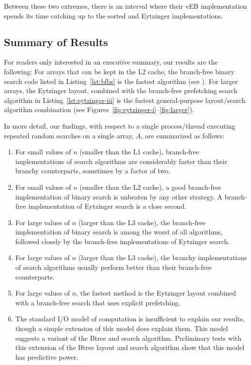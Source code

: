 \documentclass{patmorin}
\newcommand{\lstref}[1]{Listing~\ref{lst:#1}}
\begin{document}
Between these two extremes, there is an interval where their vEB
implementation spends its time catching up to the sorted and Eytzinger
implementations.


\subsection{Summary of Results}

For readers only interested in an executive summary, our results are the
following: For arrays that can be kept in the L2 cache, the branch-free
binary search code listed in \lstref{bfbs} is the fastest algorithm (see
).  For larger arrays, the Eytzinger layout, combined
with the branch-free prefetching search algorithm in \lstref{eytzinger-iii}
is the fastest general-purpose layout/search algorithm combination
(see Figures~\ref{fig:eytzinger-i}--\ref{fig:larger}).

In more detail, our findings, with respect to a single process/thread
executing repeated random searches on a single array, $A$, are summarized
as follows:

\begin{enumerate}
  \item For small values of $n$ (smaller than the L1 cache), branch-free
    implementations of search algorithms are considerably faster than their
    branchy counterparts, sometimes by a factor of two.
  
  \item For small values of $n$ (smaller than the L2 cache), a good
    branch-free implementation of binary search is unbeaten by any other
    strategy.  A branch-free implementation of Eytzinger search is a
    close second.
  
  \item For large values of $n$ (larger than the L3 cache), the branch-free
    implementation of binary search is among the worst of all algorithms,
    followed closely by the branch-free implementations of Eytzinger
    search.
  
  \item For large values of $n$ (larger than the L3 cache), the branchy
    implementations of search algorithms usually perform better than their
    branch-free counterparts.

  \item For large values of $n$, the fastest method is the Eytzinger
   layout combined with a branch-free search that uses explicit prefetching.

  \item The standard I/O model of computation \cite{aggarwal.vitter:input}
   is insufficient to explain our results, though a simple extension of
   this model does explain them.  This model suggests a variant of the
   Btree and search algorithm. Preliminary tests with this extension
   of the Btree layout and search algorithm show that this model has
   predictive power.
\end{enumerate}
\end{document}
